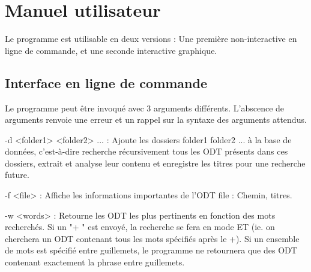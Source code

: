 \section{Manuel utilisateur}
Le programme est utilisable en deux versions : Une première non-interactive en ligne de commande, et une seconde interactive graphique.
\subsection{Interface en ligne de commande}

Le programme peut être invoqué avec 3 arguments différents. L'abscence de arguments renvoie une erreur et un rappel sur la syntaxe des arguments attendus.

-d <folder1> <folder2> ... : Ajoute les dossiers folder1 folder2 ... à la base de données, c'est-à-dire recherche récursivement tous les ODT présents dans ces dossiers, extrait et analyse leur contenu et enregistre les titres pour une recherche future.

-f <file> : Affiche les informations importantes de l'ODT file : Chemin, titres.

-w <words> : Retourne les ODT les plus pertinents en fonction des mots recherchés. Si un "+ " est envoyé, la recherche se fera en mode ET (ie. on cherchera un ODT contenant tous les mots spécifiés après le +). Si un ensemble de mots est spécifié entre guillemets, le programme ne retournera que des ODT contenant exactement la phrase entre guillemets.